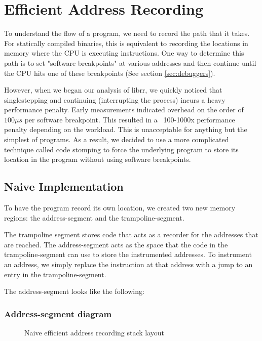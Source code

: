 \chapter{Efficient Address Recording}
\label{sec:effaddrrec}

To understand the flow of a program, we need to record the path that it takes. For statically compiled binaries, this is equivalent to recording the locations in memory where the CPU is executing instructions. One way to determine this path is to set "software breakpoints" at various addresses and then continue until the CPU hits one of these breakpoints (See section \ref{sec:debuggers}).

However, when we began our analysis of librr, we quickly noticed that singlestepping and continuing (interrupting the process) incurs a heavy performance penalty. Early measurements indicated overhead on the order of $100 \mu s$ per software breakpoint. This resulted in a ~100-1000x performance penalty depending on the workload. This is unacceptable for anything but the simplest of programs. As a result, we decided to use a more complicated technique called code stomping to force the underlying program to store its location in the program without using software breakpoints.

\section{Naive Implementation}

To have the program record its own location, we created two new memory regions: the address-segment and the trampoline-segment.

The trampoline segment stores code that acts as a recorder for the addresses that are reached. The address-segment acts as the space that the code in the trampoline-segment can use to store the instrumented addresses. To instrument an address, we simply replace the instruction at that address with a jump to an entry in the trampoline-segment.

The address-segment looks like the following:
\subsection{Address-segment diagram}
\begin{figure}
\begin{drawstack}
  \startframe
   
  \startframe
   \cellcom{}
   
   \cellcom{}
   \cellcom{}
   \cellcom{}
   
\end{drawstack}
  \caption{Naive efficient address recording stack layout}
\end{figure}
